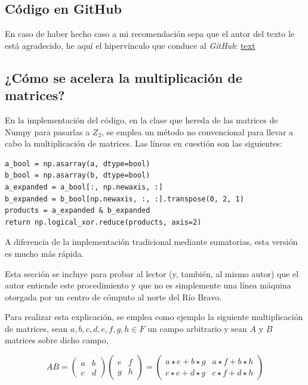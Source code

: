 \documentclass{article}
\begin{document}
\subsection{Código en GitHub}

En caso de haber hecho caso a mi recomendación sepa que el autor del texto le está agradecido, he aquí el hipervínculo que conduce al \textit{GitHub}: \href{URL}{text}

\subsection{¿Cómo se acelera la multiplicación de matrices?}

En la implementación del código, en la clase que hereda de las matrices de Numpy para pasarlas a $Z_2$, se emplea un método no convencional para llevar a cabo la multiplicación de matrices. Las líneas en cuestión son las siguientes:

\begin{verbatim}
a_bool = np.asarray(a, dtype=bool)
b_bool = np.asarray(b, dtype=bool)
a_expanded = a_bool[:, np.newaxis, :]
b_expanded = b_bool[np.newaxis, :, :].transpose(0, 2, 1)
products = a_expanded & b_expanded
return np.logical_xor.reduce(products, axis=2)  
\end{verbatim}

A diferencia de la implementación tradicional mediante sumatorias, esta versión es mucho más rápida. 

Esta sección se incluye para probar al lector (y, también, al mismo autor) que el autor entiende este procedimiento y que no es simplemente una línea máquina otorgada por un centro de cómputo al norte del Río Bravo.

Para realizar esta explicación, se emplea como ejemplo la siguiente multiplicación de matrices, sean $a, b, c, d, e, f, g, h \in F$ un campo arbitrario y sean $A$ y $B$ matrices sobre dicho campo, 

$$
A B = 
\begin{pmatrix}
    a & b \\
    c & d
\end{pmatrix}
\begin{pmatrix}
    e & f \\
    g & h
\end{pmatrix}
= \begin{pmatrix}
    a \star e + b \star g & a \star f + b \star h \\
    c \star e + d \star g & c \star f + d \star h
\end{pmatrix}
$$
\end{document}
